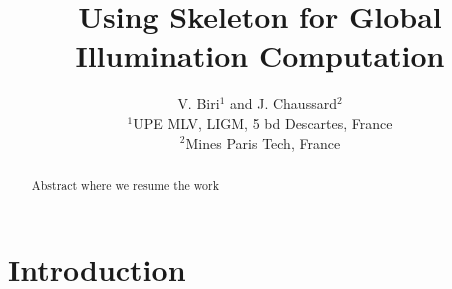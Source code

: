 

\title[Skeleton Global Illumination]%
      {Using Skeleton for Global Illumination Computation}

\author[V. Biri \& J. Chaussard]
       {V. Biri$^{1}$
        and J. Chaussard$^{2}$
        \\
         $^1$UPE MLV, LIGM, 5 bd Descartes, France\\
         $^2$Mines Paris Tech, France
       }


%




\maketitle

\begin{abstract}
Abstract where we resume the work
\begin{classification} %
\end{classification}

\end{abstract}





\section{Introduction}

